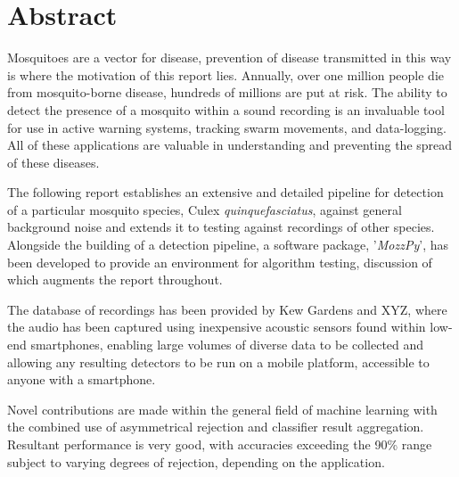 \section*{Abstract}


Mosquitoes are a vector for disease, prevention of disease transmitted in this way is where the motivation of this report lies. Annually, over one million people die from mosquito-borne disease, hundreds of millions are put at risk. The ability to detect the presence of a mosquito within a sound recording is an invaluable tool for use in active warning systems, tracking swarm movements, and data-logging. All of these applications are valuable in understanding and preventing the spread of these diseases. 

The following report establishes an extensive and detailed pipeline for detection of a particular mosquito species, Culex \textit{quinquefasciatus}, against general background noise and extends it to testing against recordings of other species. Alongside the building of a detection pipeline, a software package, '\textit{MozzPy}', has been developed to provide an environment for algorithm testing, discussion of which augments the report throughout.

The database of recordings has been provided by Kew Gardens and XYZ, where the audio has been captured using inexpensive acoustic sensors found within low-end smartphones, enabling large volumes of diverse data to be collected and allowing any resulting detectors to be run on a mobile platform, accessible to anyone with a smartphone.

Novel contributions are made within the general field of machine learning with the combined use of asymmetrical rejection and classifier result aggregation. Resultant performance is very good, with accuracies exceeding the 90\% range subject to varying degrees of rejection, depending on the application.